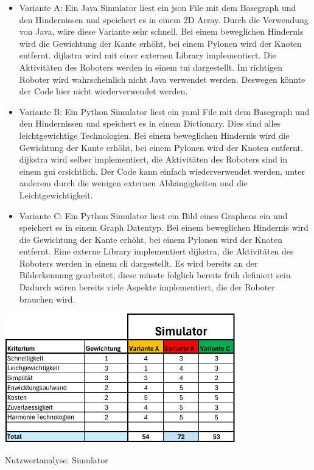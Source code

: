 \begin{itemize}
    \item Variante A: Ein Java Simulator liest ein \gls{json} File mit dem Basegraph und den Hindernissen und speichert es in einem 2D Array. Durch die Verwendung von Java, wäre diese Variante sehr schnell. Bei einem beweglichen Hindernis wird die Gewichtung der Kante erhöht, bei einem Pylonen wird der Knoten entfernt. \gls{dijkstra} wird mit einer externen Library implementiert. Die Aktivitäten des Roboters werden in einem \acrfull{tui} dargestellt. Im richtigen Roboter wird wahrscheinlich nicht Java verwendet werden. Deswegen könnte der Code hier nicht wiederverwendet werden.
    \item Variante B: Ein Python Simulator liest ein \gls{yaml} File mit dem Basegraph und den Hindernissen und speichert es in einem Dictionary. Dies sind alles leichtgewichtige Technologien. Bei einem beweglichen Hindernis wird die Gewichtung der Kante erhöht, bei einem Pylonen wird der Knoten entfernt. \gls{dijkstra} wird selber implementiert, die Aktivitäten des Roboters sind in einem \acrfull{gui} ersichtlich. Der Code kann einfach wiederverwendet werden, unter anderem durch die wenigen externen Abhängigkeiten und die Leichtgewichtigkeit. 
    \item Variante C: Ein Python Simulator liest ein Bild eines Graphens ein und speichert es in einem Graph Datentyp. Bei einem beweglichen Hindernis wird die Gewichtung der Kante erhöht, bei einem Pylonen wird der Knoten entfernt. Eine externe Library implementiert \gls{dijkstra}, die Aktivitäten des Roboters werden in einem \acrfull{cli} dargestellt. Es wird bereits an der Bilderkennung gearbeitet, diese müsste folglich bereits früh definiert sein. Dadurch wären bereits viele Aspekte implementiert, die der Roboter brauchen wird.
\end{itemize}

\begin{table}[H]
\centering
\includegraphics[width=0.75\textwidth]{assets/Nutzwertanalyse-Simulator.pdf}
\caption{Nutzwertanalyse: Simulator}
\label{table:nutzwert-Simulator}
\end{table}

